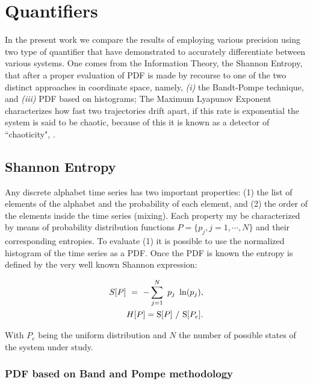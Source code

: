 \documentclass[conference]{IEEEtran}
\begin{document}
\section{Quantifiers}
\label{sec:Quantifiers}

In the present work we compare the results of employing various
precision using two type of quantifier that have demonstrated to
accurately differentiate between various systems. One comes from
the Information Theory, the Shannon Entropy, that after a proper
evaluation of PDF is made by recourse to one of the two distinct
approaches in coordinate space, namely, {\it (i)  \/} the
Bandt-Pompe technique, and {\it (iii)\/} PDF based on histograms;
The Maximum Lyapunov Exponent characterizes how fast two
trajectories drift apart, if this rate is exponential the system
is said to be chaotic, because of this it is known as a detector
of ``chaoticity", \cite{strotgartz1994,Kantz1994,Sprott2003}.

\subsection{Shannon Entropy}
%
Any discrete alphabet time series has two important properties:
(1) the list of elements of the alphabet and the probability of
each element, and (2) the order of the elements inside the time
series (mixing). Each property my be characterized by means of
probability distribution functions  $P = \{ p_j, j=1, \cdots, N
\}$ and their corresponding entropies. To evaluate (1) it is
possible to use the normalized histogram of the time series as a
PDF. Once the PDF is known the entropy is defined by the very well
known Shannon expression:

\begin{eqnarray}
S[P]~=~-\sum _{j=1}^{N}~p_j~\ln( p_j ), \nonumber\\
H[P] = {\rm S}[P]~/~{\rm S}[P_e]. \label{eq:shannon}
\end{eqnarray}

With $P_e $ being the uniform  distribution and $N$  the number of
possible states of the system under study.





\subsubsection{PDF based on Band and Pompe methodology}
\end{document}

